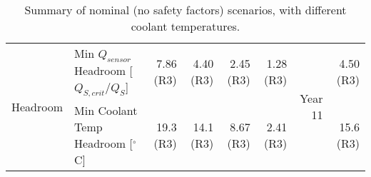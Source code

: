 \begin{table}[ht]
\begin{subtable}[t]{.99\linewidth}
\begin{centering}
{\begin{tabular}{|l|l|r|r|r|r|r|r|}
\multirow{2}{*}{Headroom}       & Min $Q_{sensor}$ Headroom [$Q_{S,crit}/Q_{S}$] &   7.86 (R3) &     4.40 (R3) &     2.45 (R3) &     1.28 (R3) & \multirow{2}{*}{Year 11} &     4.50 (R3) \\ 
                                & Min Coolant Temp Headroom [$^\circ$C]        &     19.3 (R3) &     14.1 (R3) &     8.67 (R3) &     2.41 (R3) &  &     15.6 (R3) \\ 
\hline\end{tabular}
} %
\end{centering}
\caption{Summary of nominal (no safety factors) scenarios, with different coolant temperatures.}
\end{subtable}

\vspace{5mm}


\end{table}

